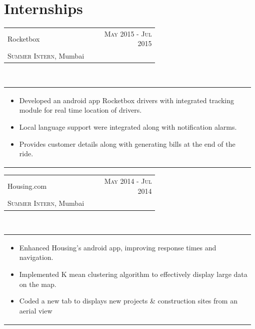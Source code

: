 \documentclass[a4paper]{article} %
\newcommand{\verticalspacing}{-0.05cm}
\newcommand{\bulletspace}{0.7cm}
\newcommand{\projectheadspacing}{6.9cm}
\newcommand{\cproject}[5]{%
    \begin{tabular}{p{0.60\linewidth}r}
        \textcolor{NavyBlue}{\small #2} & \multicolumn{1}{m{ \projectheadspacing{} }}{\raggedleft \small {\textsc{#1}}}\\
        \small {#3} & \small {#4}
    \end{tabular}\\
    \begin{tabular}{p{0.98\linewidth}}
    \vspace{-0.3cm}
        \small{#5}
    \end{tabular}
    \vspace{\verticalspacing{}}
}
\begin{document}



%
\section{Internships}

\cproject
      {May 2015 - Jul 2015}
      {Rocketbox}
      {\textsc{Summer Intern}, Mumbai}
      {}
      {%
        \begin{itemize}[leftmargin=\bulletspace{}]
         \item Developed an android app Rocketbox drivers with integrated tracking module for real time location of drivers.
         \item Local language support were integrated along with notification alarms.
         \item Provides customer details along with generating bills at the end of the ride. 
        \end{itemize}
      }

\cproject
      {May 2014 - Jul 2014}
      {Housing.com}
      {\textsc{Summer Intern}, Mumbai}
      {}
      {%
        \begin{itemize}[leftmargin=\bulletspace{}]
         \item Enhanced Housing’s android app, improving response times and navigation. 
         \item Implemented K mean clustering algorithm to effectively display large data on the map. 
         \item Coded a new tab to displays new projects \& construction sites from an aerial view 
        \end{itemize}
      }


\end{document}
